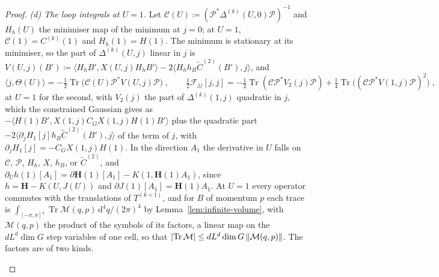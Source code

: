 \documentclass[11pt]{preprint}
\newcommand{\dd}{\mathrm{d}}
\DeclarePairedDelimiter{\abs}{\lvert}{\rvert}
\DeclarePairedDelimiter{\norm}{\lVert}{\rVert}
\numberwithin{equation}{section}
\theoremstyle{definition}
\theoremstyle{remark}
\theoremstyle{plain}
\begin{document}
\begin{proof}
\emph{(d) The loop integrals at $U = 1$.} Let $\mathcal C(U) \coloneqq (\mathcal P^*\Delta^{(k)}(U, 0)\mathcal P)^{-1}$ and $H_h(U)$ the minimiser map of the minimum at $j = 0$; at $U = 1$, $\mathcal C(1) = C^{(k)}(1)$ and $H_h(1) = H(1)$. The minimum is stationary at its minimiser, so the part of $\Delta^{(k)}(U, j)$ linear in $j$ is $V(U, j)(B') \coloneqq \langle H_hB', X(U, j)H_hB' \rangle - 2\langle H_hh_B\tilde C^{(2)}(B'), j \rangle$, and
\begin{equation}\label{eq:theta-trace}
    \langle j, \Theta(U) \rangle = -\tfrac12\operatorname{Tr}\bigl(\mathcal C(U)\mathcal P^*V(U, j)\mathcal P\bigr)\;,
    \qquad
    \tfrac12\mathcal F_{jj}[j, j] = -\tfrac12\operatorname{Tr}(\mathcal C\mathcal P^*V_2(j)\mathcal P) + \tfrac14\operatorname{Tr}\bigl((\mathcal C\mathcal P^*V(1, j)\mathcal P)^2\bigr)\;,
\end{equation}
at $U = 1$ for the second, with $V_2(j)$ the part of $\Delta^{(k)}(1, j)$ quadratic in $j$, which the constrained Gaussian gives as $-\langle H(1)B', X(1, j)C_GX(1, j)H(1)B' \rangle$ plus the quadratic part $-2\langle\partial_jH_1[j]h_B\tilde C^{(2)}(B'), j\rangle$ of the term of $j$, with $\partial_jH_1[j] = -C_GX(1, j)H(1)$. In the direction $A_1$ the derivative in $U$ falls on $\mathcal C$, $\mathcal P$, $H_h$, $X$, $h_B$, or $\tilde C^{(2)}$, and $\partial_Uh(1)[A_1] = \partial\mathbf H(1)[A_1] - K(1, \mathbf H(1)A_1)$, since $h = \mathbf H - K(U, J(U))$ and $\partial J(1)[A_1] = \mathbf H(1)A_1$. At $U = 1$ every operator commutes with the translations of $T^{(k+1)}$, and for $B$ of momentum $p$ each trace is $\int_{[-\pi,\pi]^4}\operatorname{Tr}\mathcal M(q, p)\,\dd^4q/(2\pi)^4$ by Lemma~\ref{lem:infinite-volume}, with $\mathcal M(q, p)$ the product of the symbols of its factors, a linear map on the $dL^d\dim G$ step variables of one cell, so that $\abs{\operatorname{Tr}\mathcal M} \leq dL^d\dim G\,\norm{\mathcal M(q, p)}$. The factors are of two kinds.
\begin{itemize}

\end{itemize}
\end{proof}
\end{document}

